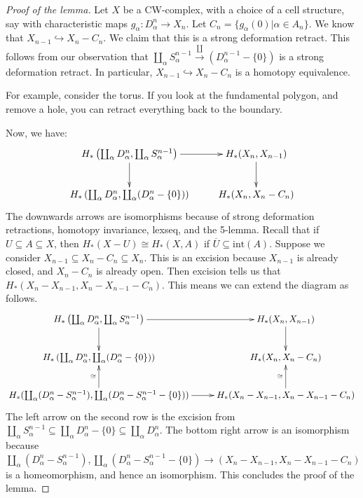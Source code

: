 \documentclass{amsart}
\theoremstyle{theorem}
\theoremstyle{definition}
\begin{document}
\begin{proof}[Proof of the lemma]
Let $X$ be a CW-complex, with a choice of a cell structure, say with characteristic maps $g_\alpha:D^n_\alpha\to X_n$. Let $C_n=\{g_\alpha(0)|\alpha\in A_n\}$. We know that $X_{n-1}\hookrightarrow X_n-C_n$. We claim that this is a strong deformation retract. This follows from our observation that $\coprod_\alpha S^{n-1}_\alpha\xrightarrow\coprod(D^{n-1}_\alpha-\{0\})$ is a strong deformation retract. In particular, $X_{n-1}\hookrightarrow X_n-C_n$ is a homotopy equivalence.

For example, consider the torus. If you look at the fundamental polygon, and remove a hole, you can retract everything back to the boundary.

Now, we have:
\begin{equation*}
\xymatrix{ H_\ast\left(\coprod_\alpha D^n_\alpha,\coprod_\alpha S^{n-1}_\alpha\right)\ar[r]\ar[d] & H_\ast(X_n,X_{n-1})\ar[d]\\
 H_\ast\left(\coprod_\alpha D^n_\alpha,\coprod_\alpha (D^n_\alpha-\{0\})\right) & H_\ast(X_n,X_n-C_n)}
\end{equation*}
The downwards arrows are isomorphisms because of strong deformation retractions, homotopy invariance, lexseq, and the 5-lemma. Recall that if $U\subseteq A\subseteq X$, then $ H_\ast(X-U)\cong H_\ast(X,A)$ if $\overline{U}\subseteq \mathrm{int}(A)$. Suppose we consider $X_{n-1}\subseteq X_n-C_n\subseteq X_n$. This is an excision because $X_{n-1}$ is already closed, and $X_n-C_n$ is already open. Then excision tells us that $ H_\ast(X_n-X_{n-1},X_n-X_{n-1}-C_n)$. This means we can extend the diagram as follows.
\begin{equation*}
\xymatrix{ H_\ast\left(\coprod_\alpha D^n_\alpha,\coprod_\alpha S^{n-1}_\alpha\right)\ar[r]\ar[d] & H_\ast(X_n,X_{n-1})\ar[d]\\
 H_\ast\left(\coprod_\alpha D^n_\alpha,\coprod_\alpha (D^n_\alpha-\{0\})\right) & H_\ast(X_n,X_n-C_n)\\
 H_\ast(\coprod_\alpha(D^n_\alpha-S^{n-1}_\alpha),\coprod_\alpha(D^n_\alpha-S^{n-1}_\alpha-\{0\}))\ar[r]\ar[u]^\cong & H_\ast(X_n-X_{n-1},X_n-X_{n-1}-C_n)\ar[u]^\cong}
\end{equation*}
The left arrow on the second row is the excision from $\coprod_\alpha S^{n-1}_\alpha\subseteq \coprod_\alpha D^n_\alpha-\{0\}\subseteq \coprod_\alpha D^n_\alpha$. The bottom right arrow is an isomorphism because $\coprod_\alpha(D^n_\alpha-S^{n-1}_\alpha),\coprod_\alpha(D^n_\alpha-S^{n-1}_\alpha-\{0\})\to (X_n-X_{n-1},X_n-X_{n-1}-C_n)$ is a homeomorphism, and hence an isomorphism. This concludes the proof of the lemma.
\end{proof}
\end{document}
